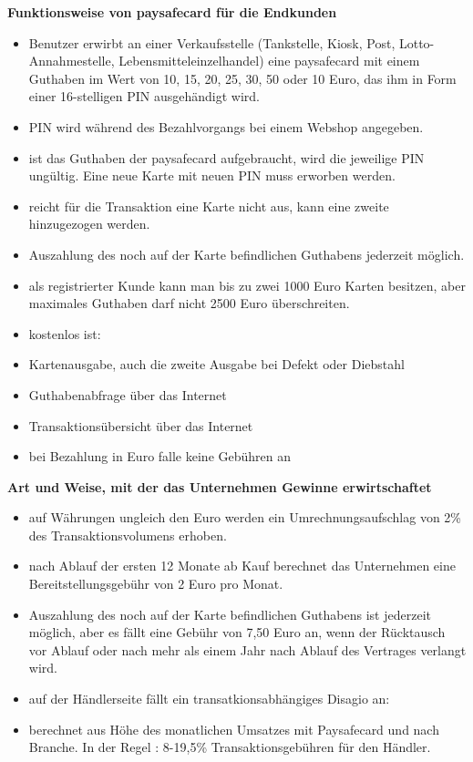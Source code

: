 \textbf{Funktionsweise von paysafecard für die Endkunden}

\begin{itemize}
        \item Benutzer erwirbt an einer Verkaufsstelle (Tankstelle, Kiosk, Post, Lotto-Annahmestelle, Lebensmitteleinzelhandel) eine paysafecard mit einem Guthaben im Wert von 10, 15, 20, 25, 30, 50 oder 10 Euro, das ihm in Form einer 16-stelligen PIN ausgehändigt wird.
        \item PIN wird während des Bezahlvorgangs bei einem Webshop angegeben.
        \item ist das Guthaben der paysafecard aufgebraucht, wird die jeweilige PIN ungültig. Eine neue Karte mit neuen PIN muss erworben werden.
        \item reicht für die Transaktion eine Karte nicht aus, kann eine zweite hinzugezogen werden.
        \item Auszahlung des noch auf der Karte befindlichen Guthabens jederzeit möglich.
        \item als registrierter Kunde kann man bis zu zwei 1000 Euro Karten besitzen, aber maximales Guthaben darf nicht 2500 Euro überschreiten.
        \item kostenlos ist:
        \item   Kartenausgabe, auch die zweite Ausgabe bei Defekt oder Diebstahl
        \item   Guthabenabfrage über das Internet
        \item   Transaktionsübersicht über das Internet
        \item   bei Bezahlung in Euro falle keine Gebühren an
\end{itemize}


\textbf{Art und Weise, mit der das Unternehmen Gewinne erwirtschaftet}

\begin{itemize}
        \item auf Währungen ungleich den Euro werden ein Umrechnungsaufschlag von 2\% des Transaktionsvolumens erhoben.
        \item nach Ablauf der ersten 12 Monate ab Kauf berechnet das Unternehmen eine Bereitstellungsgebühr von 2 Euro pro Monat.
        \item Auszahlung des noch auf der Karte befindlichen Guthabens ist jederzeit möglich, aber es fällt eine Gebühr von 7,50 Euro an, wenn der Rücktausch vor Ablauf oder nach mehr als einem Jahr nach Ablauf des Vertrages verlangt wird.
        \item auf der Händlerseite fällt ein transatkionsabhängiges Disagio an:
        \item   berechnet aus Höhe des monatlichen Umsatzes mit Paysafecard und nach Branche. In der Regel : 8-19,5\% Transaktionsgebühren für den Händler.
\end{itemize}



